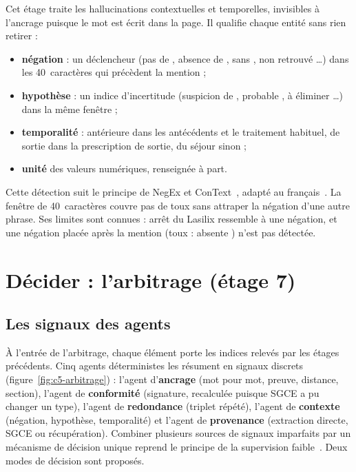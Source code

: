 Cet étage traite les hallucinations contextuelles et temporelles, invisibles à l'ancrage puisque le mot est écrit dans la page. Il qualifie chaque entité sans rien retirer :
\begin{itemize}
  \item \textbf{négation} : un déclencheur (\og pas de \fg{}, \og absence de \fg{}, \og sans \fg{}, \og non retrouvé \fg{}\dots) dans les 40~caractères qui précèdent la mention ;
  \item \textbf{hypothèse} : un indice d'incertitude (\og suspicion de \fg{}, \og probable \fg{}, \og à éliminer \fg{}\dots) dans la même fenêtre ;
  \item \textbf{temporalité} : antérieure dans les antécédents et le traitement habituel, de sortie dans la prescription de sortie, du séjour sinon ;
  \item \textbf{unité} des valeurs numériques, renseignée à part.
\end{itemize}
Cette détection suit le principe de NegEx et ConText~\cite{chapman2001negex,harkema2009context}, adapté au français~\cite{deleger2012negation}. La fenêtre de 40~caractères couvre \og pas de toux \fg{} sans attraper la négation d'une autre phrase. Ses limites sont connues : \og arrêt du Lasilix \fg{} ressemble à une négation, et une négation placée après la mention (\og toux : absente \fg{}) n'est pas détectée.

\section{Décider : l'arbitrage (étage 7)}\label{sec:c5-etage7}

\subsection{Les signaux des agents}\label{sec:c5-signaux}

À l'entrée de l'arbitrage, chaque élément porte les indices relevés par les étages précédents. Cinq agents déterministes les résument en signaux discrets (figure~\ref{fig:c5-arbitrage}) : l'agent d'\textbf{ancrage} (mot pour mot, preuve, distance, section), l'agent de \textbf{conformité} (signature, recalculée puisque SGCE a pu changer un type), l'agent de \textbf{redondance} (triplet répété), l'agent de \textbf{contexte} (négation, hypothèse, temporalité) et l'agent de \textbf{provenance} (extraction directe, SGCE ou récupération). Combiner plusieurs sources de signaux imparfaits par un mécanisme de décision unique reprend le principe de la supervision faible~\cite{ratner2017snorkel}. Deux modes de décision sont proposés.

